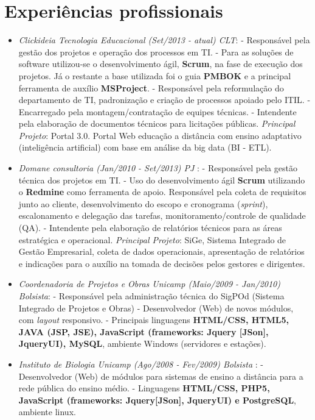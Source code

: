 \documentclass[a4paper,11pt]{article}
\begin{document}
\section{Experiências profissionais}
\begin{itemize}

\item \emph{Clickideia Tecnologia Educacional (Set/2013 - atual) CLT}: 
  \subitem - Responsável pela gestão dos projetos e operação dos processos em TI.
  \subitem - Para as soluções de software utilizou-se o desenvolvimento ágil, \textbf{Scrum}, na fase de execução dos projetos. Já o restante a base utilizada foi o guia \textbf{PMBOK} e a principal ferramenta de auxílio \textbf{MSProject}.
  \subitem - Responsável pela reformulação do departamento de TI, padronização e criação de processos apoiado pelo ITIL.
  \subitem - Encarregado pela montagem/contratação de equipes técnicas.
  \subitem - Intendente pela elaboração de documentos técnicos para licitações públicas.
  \subitem \emph{Principal Projeto}: Portal 3.0. Portal Web educação a distância com ensino adaptativo (inteligência artificial) com base em análise da big data (BI - ETL).

\item \emph{Domane consultoria (Jan/2010 - Set/2013) PJ }: 
  \subitem - Responsável pela gestão técnica dos projetos em TI. 
  \subitem - Uso do desenvolvimento ágil \textbf{Scrum} utilizando o \textbf{Redmine} como ferramenta de apoio. Responsável pela coleta de requisitos junto ao cliente, desenvolvimento do escopo e cronograma (\textit{sprint}), escalonamento e delegação das tarefas, monitoramento/controle de qualidade (QA).
  \subitem - Intendente pela elaboração de relatórios técnicos para as áreas estratégica e operacional.
  \subitem \emph{Principal Projeto}:  SiGe, Sistema Integrado de Gestão Empresarial, coleta de dados operacionais, apresentação de relatórios e indicações para o auxílio na tomada de decisões pelos gestores e dirigentes.

\item \emph{Coordenadoria de Projetos e Obras Unicamp (Maio/2009 - Jan/2010) Bolsista}: 
  \subitem - Responsável pela administração técnica do SigPOd (Sistema Integrado de Projetos e Obras)
  \subitem - Desenvolvedor (Web) de novos módulos, com \textit{layout} responsivo.
  \subitem - Principais linguagens \textbf{HTML/CSS, HTML5, JAVA (JSP, JSE), JavaScript (frameworks: Jquery [JSon], JqueryUI), MySQL}, ambiente Windows (servidores e estações).
  
\item \emph{Instituto de Biologia Unicamp (Ago/2008 - Fev/2009) Bolsista }: 
  \subitem - Desenvolvedor (Web) de módulos para sistemas de ensino a distância para a rede pública do ensino médio.
  \subitem - Linguagens \textbf{HTML/CSS, PHP5, JavaScript (frameworks: Jquery[JSon], JqueryUI) e PostgreSQL}, ambiente linux.


\end{itemize}
\end{document}

